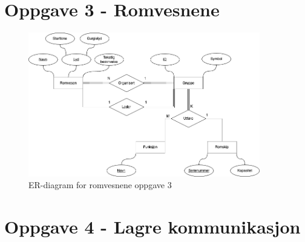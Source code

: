 \documentclass{article}
\begin{document}
\section*{Oppgave 3 - Romvesnene}
\begin{figure}[h!]
    \centering
    \includegraphics[width=0.9\textwidth]{oppgave3_oblig1.png} %
    \caption{ER-diagram for romvesnene oppgave 3} %
    \label{fig:oppgave3} %
\end{figure}

\section*{Oppgave 4 - Lagre kommunikasjon}
\end{document}
